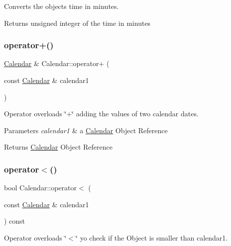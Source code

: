 Converts the object\textquotesingle{}s time in minutes. 

\begin{DoxyReturn}{Returns}
unsigned integer of the time in minutes 
\end{DoxyReturn}
\mbox{\label{class_calendar_aebeae7e3eb616dc294ae6f026f5776bf}} 
\subsubsection{\texorpdfstring{operator+()}{operator+()}}
{\footnotesize\ttfamily \hyperlink{class_calendar}{Calendar} \& Calendar\+::operator+ (\begin{DoxyParamCaption}\item[{const \hyperlink{class_calendar}{Calendar} \&}]{calendar1 }\end{DoxyParamCaption})}



Operator overloads \char`\"{}+\char`\"{} adding the values of two calendar dates. 


\begin{DoxyParams}{Parameters}
{\em calendar1} & a \hyperlink{class_calendar}{Calendar} Object Reference \\
\hline
\end{DoxyParams}
\begin{DoxyReturn}{Returns}
\hyperlink{class_calendar}{Calendar} Object Reference 
\end{DoxyReturn}
\mbox{\label{class_calendar_ab701051dc424c48d6f423cdf0bca6ad4}} 
\subsubsection{\texorpdfstring{operator$<$()}{operator<()}}
{\footnotesize\ttfamily bool Calendar\+::operator$<$ (\begin{DoxyParamCaption}\item[{const \hyperlink{class_calendar}{Calendar} \&}]{calendar1 }\end{DoxyParamCaption}) const}



Operator overloads \char`\"{}$<$\char`\"{} yo check if the Object is smaller than calendar1. 


